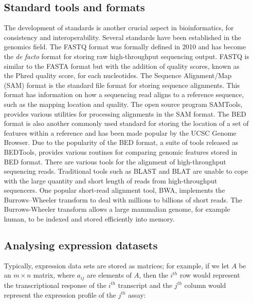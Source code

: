 \subsection{Standard tools and formats}

The development of standards is another crucial aspect in bioinformatics, for consistency and interoperability. Several standards have been established in the genomics field. The FASTQ format was formally defined in 2010\cite{pmid20015970} and has become the \textit{de facto} format for storing raw high-throughput sequencing output. FASTQ is similar to the FASTA format but with the addition of quality scores, known as the Phred quality score, for each nucleotides. The Sequence Alignment/Map (SAM) format\cite{pmid19505943} is the standard file format for storing sequence alignments. This format has information on how a sequencing read aligns to a reference sequence, such as the mapping location and quality. The open source program SAMTools\cite{Li15082009}, provides various utilities for processing alignments in the SAM format. The BED format\cite{bedformat} is also another commonly used standard for storing the location of a set of features within a reference and has been made popular by the UCSC Genome Browser\cite{Kent01062002}. Due to the popularity of the BED format, a suite of tools released as BEDTools\cite{pmid20110278}, provides various routines for comparing genomic features stored in BED format. There are various tools for the alignment of high-throughput sequencing reads. Traditional tools such as BLAST\cite{pmid2231712} and BLAT\cite{pmid11932250} are unable to cope with the large quantity and short length of reads from high-throughput sequencers. One popular short-read alignment tool, BWA\cite{pmid19451168}, implements the Burrows–Wheeler transform to deal with millions to billions of short reads. The Burrows-Wheeler transform allows a large mammalian genome, for example human, to be indexed and stored efficiently into memory\cite{pmid19430453}.

\subsection{Analysing expression datasets}

Typically, expression data sets are stored as matrices; for example, if we let $A$ be an $m \times n$ matrix, where $a_{ij}$ are elements of $A$, then the $i^{th}$ row would represent the transcriptional response of the $i^{th}$ transcript and the $j^{th}$ column would represent the expression profile of the $j^{th}$ assay:

